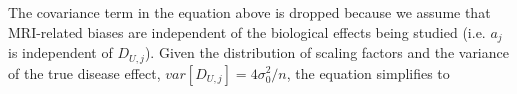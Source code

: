 The covariance term in the equation above is dropped because we assume that MRI-related biases are independent of the biological effects being studied (i.e. $a_j$ is independent of $D_{U,j}$). Given the distribution of scaling factors and the variance of the true disease effect, $var[D_{U,j}] = 4\sigma_0^2/n$, the equation simplifies to